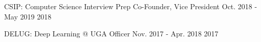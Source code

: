 \begin{cvhonors}

\cvhonor
{CSIP: Computer Science Interview Prep}
{Co-Founder, Vice President}
{Oct. 2018 - May 2019}
{2018}

\cvhonor
{DELUG: Deep Learning @ UGA}
{Officer}
{Nov. 2017 - Apr. 2018}
{2017}

\end{cvhonors}
